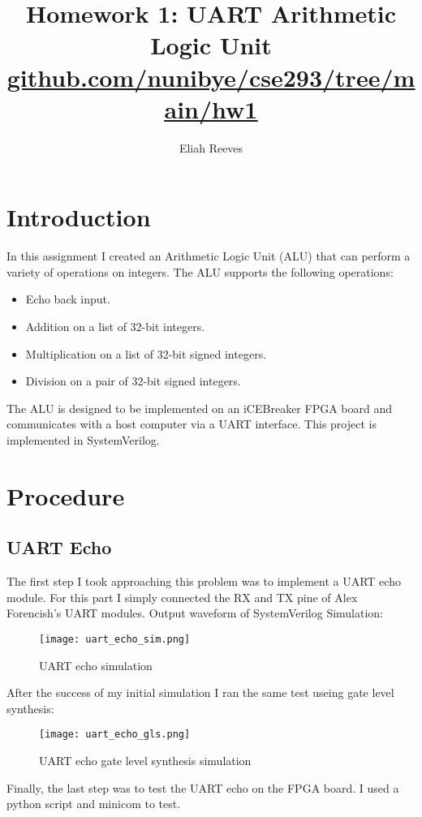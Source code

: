 \documentclass{article}
\title{Homework 1: UART Arithmetic Logic Unit \\ \large \href{https://github.com/nunibye/cse293/tree/main/hw1}{\underline{github.com/nunibye/cse293/tree/main/hw1}}}
\author{{Eliah Reeves}}
\date{\vspace{-5ex}} %
\begin{document}
\maketitle
\thispagestyle{firstpage}
\section{Introduction}

In this assignment I created an Arithmetic Logic Unit (ALU) that can perform a variety of operations on integers. The ALU supports the following operations:
\begin{itemize}
  \item Echo back input.
  \item Addition on a list of 32-bit integers.
  \item Multiplication on a list of 32-bit signed integers.
  \item Division on a pair of 32-bit signed integers.
\end{itemize}
The ALU is designed to be implemented on an iCEBreaker FPGA board and communicates with a host computer via a UART interface. This project is implemented in SystemVerilog.
\section{Procedure}
\subsection{UART Echo}
The first step I took approaching this problem was to implement a UART echo module. For this part I simply connected the RX and TX pine of Alex Forencish's UART modules.
Output waveform of SystemVerilog Simulation:

\begin{figure}[h]
  \centering
  \texttt{[image: uart\_echo\_sim.png]}
  \caption{UART echo simulation}
\end{figure}
\newpage
After the success of my initial simulation I ran the same test useing gate level synthesis:

\begin{figure}[h]
  \centering
  \texttt{[image: uart\_echo\_gls.png]}
  \caption{UART echo gate level synthesis simulation}
\end{figure}

Finally, the last step was to test the UART echo on the FPGA board. I used a python script and minicom to test.
\end{document}
